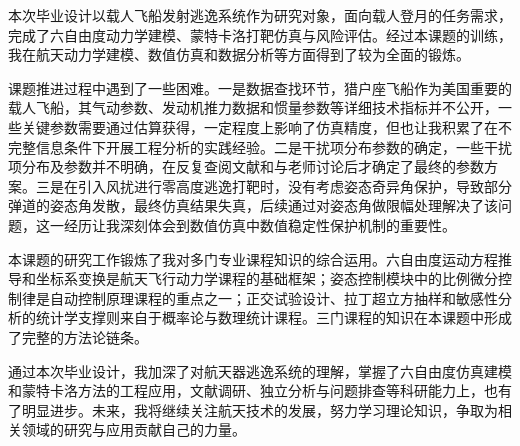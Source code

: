 
\begin{designsummary}

    本次毕业设计以载人飞船发射逃逸系统作为研究对象，面向载人登月的任务需求，完成了六自由度动力学建模、蒙特卡洛打靶仿真与风险评估。经过本课题的训练，我在航天动力学建模、数值仿真和数据分析等方面得到了较为全面的锻炼。

    课题推进过程中遇到了一些困难。一是数据查找环节，猎户座飞船作为美国重要的载人飞船，其气动参数、发动机推力数据和惯量参数等详细技术指标并不公开，一些关键参数需要通过估算获得，一定程度上影响了仿真精度，但也让我积累了在不完整信息条件下开展工程分析的实践经验。二是干扰项分布参数的确定，一些干扰项分布及参数并不明确，在反复查阅文献和与老师讨论后才确定了最终的参数方案。三是在引入风扰进行零高度逃逸打靶时，没有考虑姿态奇异角保护，导致部分弹道的姿态角发散，最终仿真结果失真，后续通过对姿态角做限幅处理解决了该问题，这一经历让我深刻体会到数值仿真中数值稳定性保护机制的重要性。

    本课题的研究工作锻炼了我对多门专业课程知识的综合运用。六自由度运动方程推导和坐标系变换是航天飞行动力学课程的基础框架；姿态控制模块中的比例微分控制律是自动控制原理课程的重点之一；正交试验设计、拉丁超立方抽样和敏感性分析的统计学支撑则来自于概率论与数理统计课程。三门课程的知识在本课题中形成了完整的方法论链条。

    通过本次毕业设计，我加深了对航天器逃逸系统的理解，掌握了六自由度仿真建模和蒙特卡洛方法的工程应用，文献调研、独立分析与问题排查等科研能力上，也有了明显进步。未来，我将继续关注航天技术的发展，努力学习理论知识，争取为相关领域的研究与应用贡献自己的力量。

\end{designsummary}
